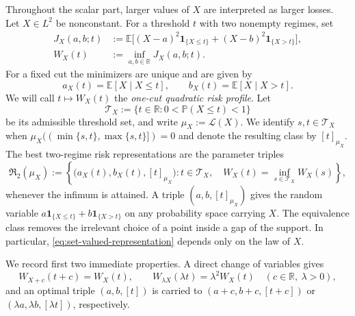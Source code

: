 \documentclass[a4paper]{amsart}
\numberwithin{equation}{section}
\theoremstyle{remark}
\newcommand{\E}{\mathbb E}
\newcommand{\R}{\mathbb R}
\newcommand{\1}{\mathbf 1}
\begin{document}
Throughout the scalar part, larger values of $X$ are interpreted as larger
losses.  Let $X\in L^2$ be nonconstant.  For a threshold $t$ with two
nonempty regimes, set
\begin{equation}\label{eq:profiled-risk-general}
 \begin{split}
 J_X(a,b;t)&:=\E\bigl[(X-a)^2\1_{\{X\leq t\}}
                    +(X-b)^2\1_{\{X>t\}}\bigr],\\
 W_X(t)&:=\inf_{a,b\in\R}J_X(a,b;t).
 \end{split}
\end{equation}
For a fixed cut the minimizers are unique and are given by
\begin{equation}\label{eq:conditional-regime-levels}
 a_X(t)=\E[X\mid X\leq t],\qquad
 b_X(t)=\E[X\mid X>t].
\end{equation}
We will call $t\mapsto W_X(t)$ the \emph{one-cut quadratic risk profile}.  Let
\[
 \mathcal T_X:=\{t\in\R:0<\mathbb P(X\leq t)<1\}
\]
be its admissible threshold set, and write $\mu_X:=\mathcal L(X)$.  We identify
$s,t\in\mathcal T_X$ when
$\mu_X((\min\{s,t\},\max\{s,t\}])=0$ and denote the resulting class by
$[t]_{\mu_X}$.  The best two-regime risk representations are the parameter
triples
\begin{equation}\label{eq:set-valued-representation}
 \mathfrak R_2(\mu_X):=
 \left\{
 \bigl(a_X(t),b_X(t),[t]_{\mu_X}\bigr):
 t\in\mathcal T_X,\quad W_X(t)=\inf_{s\in\mathcal T_X}W_X(s)
 \right\},
\end{equation}
whenever the infimum is attained.  A triple $(a,b,[t]_{\mu_X})$ gives the
random variable $a\1_{\{X\leq t\}}+b\1_{\{X>t\}}$ on any probability space
carrying $X$.  The equivalence class removes the irrelevant choice of a point
inside a gap of the support.  In particular,
\eqref{eq:set-valued-representation} depends only on the law of $X$.

We record first two immediate properties.  A direct change of variables gives
\[
 W_{X+c}(t+c)=W_X(t),\qquad
 W_{\lambda X}(\lambda t)=\lambda^2W_X(t)
 \quad(c\in\R,\ \lambda>0),
\]
and an optimal triple $(a,b,[t])$ is carried to
$(a+c,b+c,[t+c])$ or $(\lambda a,\lambda b,[\lambda t])$, respectively.
\end{document}
